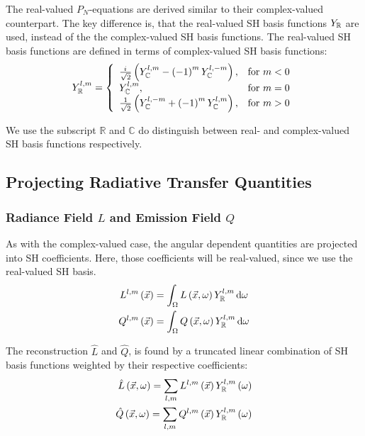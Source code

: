 \documentclass[10pt]{scrartcl}
\begin{document}
The real-valued $P_N$-equations are derived similar to their complex-valued counterpart. The key difference is, that the real-valued SH basis functions $Y_{\mathbb{R}}$ are used, instead of the the complex-valued SH basis functions. The real-valued SH basis functions are defined in terms of complex-valued SH basis functions:
\begin{align}
\label{eq:real_sh_basis}
Y_{\mathbb{R}}^{l,m}=
\left\{
\begin{array}{lr}
\frac{{i\mkern1mu}}{\sqrt{2}}\left(Y_{\mathbb{C}}^{l,m}-\left(-1\right)^mY_{\mathbb{C}}^{l,-m}\right), & \text{for } m < 0\\
Y_{\mathbb{C}}^{l,m}, & \text{for } m = 0\\
\frac{1}{\sqrt{2}}\left(Y_{\mathbb{C}}^{l,-m}+\left(-1\right)^mY_{\mathbb{C}}^{l,m}\right), & \text{for } m > 0
\end{array}
\right.
\end{align}

We use the subscript $\mathbb{R}$ and $\mathbb{C}$ do distinguish between real- and complex-valued SH basis functions respectively.

\subsection{Projecting Radiative Transfer Quantities}

\subsubsection{Radiance Field $L$ and Emission Field $Q$}
\label{sec:real_proj_L}

As with the complex-valued case, the angular dependent quantities are projected into SH coefficients. Here, those coefficients will be real-valued, since we use the real-valued SH basis.
\begin{align}
L^{l,m}\left(\vec{x}\right)
&=
\int_\Omega{L\left(\vec{x}, \omega\right)Y_{\mathbb{R}}^{l,m}\,\mathrm{d}\omega}\nonumber\\
Q^{l,m}\left(\vec{x}\right)
&=
\int_\Omega{Q\left(\vec{x}, \omega\right)Y_{\mathbb{R}}^{l,m}\,\mathrm{d}\omega}\nonumber
\end{align} 

The reconstruction $\hat{L}$ and $\hat{Q}$, is found by a truncated linear combination of SH basis functions weighted by their respective coefficients:
\begin{align}
\label{eq:real_sh_exp_L}
\hat{L}\left(\vec{x}, \omega\right) =
\sum_{l,m}
{
L^{l,m}\left(\vec{x}\right)Y_{\mathbb{R}}^{l,m}\left(\omega\right)
}
\\
\hat{Q}\left(\vec{x}, \omega\right) =
\sum_{l,m}
{
Q^{l,m}\left(\vec{x}\right)Y_{\mathbb{R}}^{l,m}\left(\omega\right)
}
\end{align}
\end{document}

